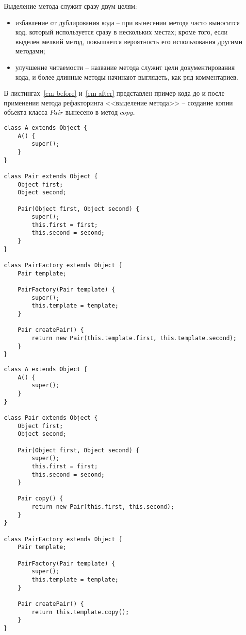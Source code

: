 Выделение метода служит сразу двум целям:
\begin{itemize}
    \item избавление от дублирования кода -- при вынесении метода часто выносится код, который используется сразу в нескольких местах;
    кроме того, если выделен мелкий метод, повышается вероятность его использования другими методами;
    \item улучшение читаемости -- название метода служит цели документирования кода,
    и более длинные методы начинают выглядеть, как ряд комментариев.
\end{itemize}
В листингах~\ref{em-before} и~\ref{em-after} представлен пример кода до и после применения метода рефакторинга <<выделение метода>> --
создание копии объекта класса $Pair$ вынесено в метод $copy$.
\lstset{
    language=Java,
    basicstyle=\small\ttfamily,
    frame=single,
    captionpos=b
}
\begin{lstlisting}[float=htb,label=em-before,caption=Код до проведения рефакторинга]
class A extends Object {
    A() {
        super();
    }
}

class Pair extends Object {
    Object first;
    Object second;

    Pair(Object first, Object second) {
        super();
        this.first = first;
        this.second = second;
    }
}

class PairFactory extends Object {
    Pair template;

    PairFactory(Pair template) {
        super();
        this.template = template;
    }

    Pair createPair() {
        return new Pair(this.template.first, this.template.second);
    }
}
\end{lstlisting}
\begin{lstlisting}[float=htb,label=em-after,caption=Код после вынесения метода]
class A extends Object {
    A() {
        super();
    }
}

class Pair extends Object {
    Object first;
    Object second;

    Pair(Object first, Object second) {
        super();
        this.first = first;
        this.second = second;
    }

    Pair copy() {
        return new Pair(this.first, this.second);
    }
}

class PairFactory extends Object {
    Pair template;

    PairFactory(Pair template) {
        super();
        this.template = template;
    }

    Pair createPair() {
        return this.template.copy();
    }
}
\end{lstlisting}